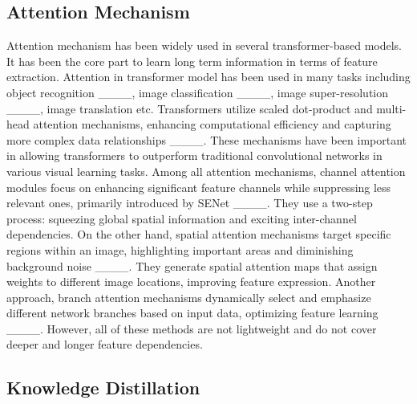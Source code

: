 \subsection{Attention Mechanism}
Attention mechanism has been widely used in several transformer-based models. It has been the core part to learn long term information in terms of feature extraction. Attention in transformer model has been used in many tasks including object recognition ____, image classification ____, image super-resolution ____, image translation etc. Transformers utilize scaled dot-product and multi-head attention mechanisms, enhancing computational efficiency and capturing more complex data relationships ____. These mechanisms have been important in allowing transformers to outperform traditional convolutional networks in various visual learning tasks. Among all attention mechanisms, channel attention modules focus on enhancing significant feature channels while suppressing less relevant ones, primarily introduced by SENet ____. They use a two-step process: squeezing global spatial information and exciting inter-channel dependencies. On the other hand, spatial attention mechanisms target specific regions within an image, highlighting important areas and diminishing background noise ____. They generate spatial attention maps that assign weights to different image locations, improving feature expression. Another approach, branch attention mechanisms dynamically select and emphasize different network branches based on input data, optimizing feature learning ____. However, all of these methods are not lightweight and do not cover deeper and longer feature dependencies. 


\subsection{Knowledge Distillation}

